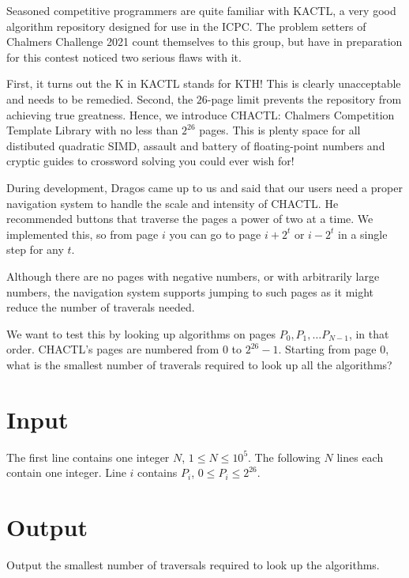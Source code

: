 Seasoned competitive programmers are quite familiar with \textsc{KACTL}, a very good algorithm repository
designed for use in the ICPC. The problem setters of Chalmers Challenge 2021 count themselves to
this group, but have in preparation for this contest noticed two serious flaws with it.

First, it turns out the \textsc{K} in \textsc{KACTL} stands for \textsc{KTH}! This is clearly
unacceptable and needs to be remedied. Second, the $26$-page limit prevents the repository from
achieving true greatness. Hence, we introduce \textsc{CHACTL}: Chalmers Competition Template Library
with no less than $2^26$ pages. This is plenty space for all distibuted quadratic SIMD, assault and
battery of floating-point numbers and cryptic guides to crossword solving you could ever wish for!

During development, Dragos came up to us and said that our users need a proper navigation system to
handle the scale and intensity of \textsc{CHACTL}. He recommended buttons that traverse the pages a
power of two at a time. We implemented this, so from page $i$ you can go to page $i + 2^t$ or $i -
2^t$ in a single step for any $t$.

Although there are no pages with negative numbers, or with arbitrarily large numbers, the navigation
system supports jumping to such pages as it might reduce the number of traverals needed.

We want to test this by looking up algorithms on pages $P_0, P_1, \ldots P_{N-1}$, in that order.
\textsc{CHACTL}'s pages are numbered from $0$ to $2^26 - 1$. Starting from page $0$, what is the
smallest number of traverals required to look up all the algorithms?

\section*{Input}
The first line contains one integer $N$, $1 \le N \le 10^5$. The following $N$ lines each contain
one integer. Line $i$ contains $P_i$, $0 \le P_i \le 2^26$.

\section*{Output}
Output the smallest number of traversals required to look up the algorithms.
